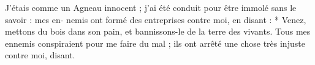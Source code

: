 J’étais comme un Agneau innocent ; j’ai été conduit pour être immolé sans le savoir : mes en- nemis ont formé des entreprises contre moi, en disant : * Venez, mettons du bois dans son pain, et bannissons-le de la terre des vivants.
\versseparator
Tous mes ennemis conspiraient pour me faire du mal ; ils ont arrêté une chose très injuste contre moi, disant.